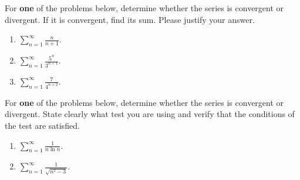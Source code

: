 \begin{problem}
For \textbf{one} of the problems below, determine whether the series is
convergent or divergent. If it is convergent, find its sum. Please justify
your answer.
\begin{enumerate}[label=(\alph*)]
\item $\displaystyle\sum_{n=1}^\infty\frac{n}{n+1}$.
\item $\displaystyle\sum_{n=1}^\infty\frac{5^n}{3^{n+1}}$.
\item $\displaystyle\sum_{n=1}^\infty\frac{7}{4^{n+2}}$.
\end{enumerate}
\end{problem}
\begin{problem}
For \textbf{one} of the problems below, determine whether the series is
convergent or divergent. State clearly what test you are using and verify
that the conditions of the test are satisfied.
\begin{enumerate}[label=(\alph*)]
\item $\displaystyle\sum_{n=1}^\infty\frac{1}{n\ln n}$.
\item $\displaystyle\sum_{n=1}^\infty\frac{1}{\sqrt{n^2-3}}$.
\end{enumerate}
\end{problem}

